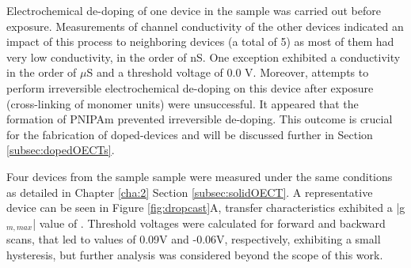 Electrochemical de-doping of one device in the sample was carried out before exposure. Measurements of channel conductivity of the other devices indicated an impact of this process to neighboring devices (a total of 5) as most of them had very low conductivity, in the order of nS. One exception exhibited a conductivity in the order of $\mu$S and a threshold voltage of 0.0 V. Moreover, attempts to perform irreversible electrochemical de-doping on this device after exposure (cross-linking of monomer units) were unsuccessful. It appeared that the formation of PNIPAm prevented irreversible de-doping. This outcome is crucial for the fabrication of doped-devices and will be discussed further in Section \ref{subsec:dopedOECTs}.

Four devices from the sample sample were measured under the same conditions as detailed in Chapter \ref{cha:2} Section \ref{subsec:solidOECT}. A representative device can be seen in Figure \ref{fig:dropcast}A, transfer characteristics exhibited a |g$_{m,max}$| value of . Threshold voltages were calculated for forward and backward scans, that led to values of 0.09V and -0.06V, respectively, exhibiting a small hysteresis, but further analysis was considered beyond the scope of this work. 

